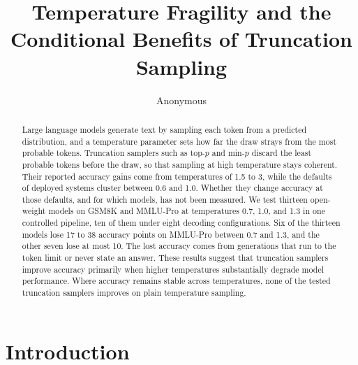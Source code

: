\documentclass[11pt]{article}
\title{Temperature Fragility and the Conditional Benefits of Truncation Sampling}
\author{Anonymous}%
\begin{document}
\maketitle

\begin{abstract}
Large language models generate text by sampling each token from a predicted distribution, and a
temperature parameter sets how far the draw strays from the most probable tokens. Truncation
samplers such as top-$p$ and min-$p$ discard the least probable tokens before the draw, so that
sampling at high temperature stays coherent. Their reported accuracy gains come from temperatures
of 1.5 to 3, while the defaults of deployed systems cluster between 0.6 and 1.0. Whether they change
accuracy at those defaults, and for which models, has not been measured. We test thirteen open-weight
models on GSM8K and MMLU-Pro at temperatures 0.7, 1.0, and 1.3 in one controlled pipeline, ten
of them under eight decoding configurations. Six of the thirteen models lose 17 to 38 accuracy
points on MMLU-Pro between 0.7 and 1.3, and the other seven lose at most 10. The lost accuracy
comes from generations that run to the token limit or never state an answer. These results suggest
that truncation samplers improve accuracy primarily when higher temperatures substantially degrade
model performance. Where accuracy remains stable across temperatures, none of the tested
truncation samplers improves on plain temperature sampling.
\end{abstract}

\section{Introduction}
\label{sec:intro}
\end{document}
